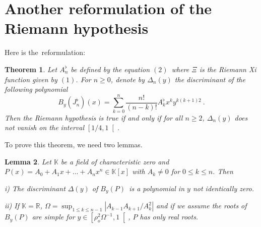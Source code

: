 \documentclass{article}
\newtheorem{theorem}{Theorem}[section]
\newtheorem{lemma}[theorem]{Lemma}
\begin{document}
\section{Another reformulation of the Riemann hypothesis}

Here is the\bigskip\ reformulation:

\begin{theorem}
Let $A_{n}^{\flat }$ be defined by the equation $\left( 2\right) $\ where $\Xi $ is the Riemann Xi function given by $\left( 1\right) $. For $n\geq 0$,
denote by $\Delta _{n}\left( y\right) $ the discriminant of the following
polynomial 
\begin{equation*}
B_{y}\left( J_{n}^{\flat }\right) \left( x\right) =\sum_{k=0}^{n}\dfrac{n!}{\left( n-k\right) !}A_{k}^{\flat }x^{k}y^{k\left( k+1\right) 2}\ \text{.}
\end{equation*}
Then the Riemann hypothesis is true if and only if for all $n\geq 2$, $\Delta _{n}\left( y\right) $ does not vanish on the interval $\left[ 1/4,1\right[ $\bigskip .
\end{theorem}

\bigskip To prove this theorem, we need two lemmas.

\begin{lemma}
\bigskip Let $\mathbb{K}$ be a field of characteristic zero and $P\left(
x\right) =A_{0}+A_{1}x+...+A_{n}x^{n}\in \mathbb{K}\left[ x\right] $ with $A_{k}\neq 0$ for $0\leq k\leq n$. Then

i) The discriminant $\Delta \left( y\right) $ of $B_{y}\left( P\right) $\ is
a polynomial in $y$ not identically zero.

ii) If $\mathbb{K}=\mathbb{R}$, $\Omega =\sup_{1\leq k\leq n-1}\left|
A_{k-1}A_{k+1}/A_{k}^{2}\right| $ and if we assume the roots of $B_{y}\left(
P\right) $ are simple for $y\in \left[ \rho _{o}^{2}\Omega ^{-1},1\right[ $, 
$P$ has only real roots.
\end{lemma}
\end{document}
